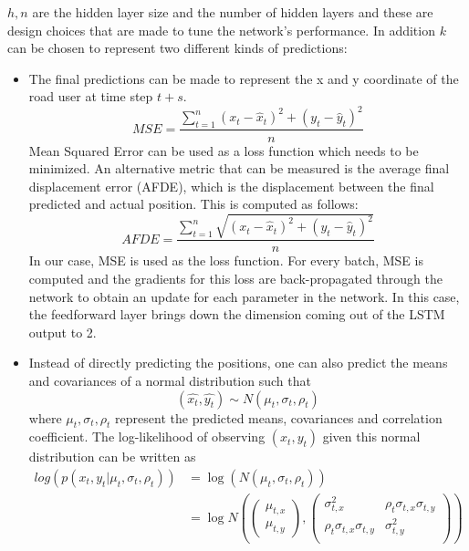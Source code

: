 \documentclass{article}
\begin{document}
 $h,n$ are the hidden layer size and the number of hidden layers and these are design choices that are made to tune the network's performance. In addition $k$ can be chosen to represent two different kinds of predictions:
 \begin{itemize}
     \item The final predictions can be made to represent the  x and y coordinate of the road user at time step $t+s$. 
    \begin{equation}
    MSE=\frac{\sum_{t=1}^n(x_t-\hat{x}_t)^2+(y_t-\hat{y}_t)^2}{n}
    \end{equation}
    Mean Squared Error can be used as a loss function which needs to be minimized. An alternative metric that can be measured is the average final displacement error (AFDE), which is the displacement between the final predicted and actual position. This is computed as follows:
    \begin{equation}
    AFDE=\frac{\sum_{t=1}^n\sqrt{(x_t-\hat{x}_t)^2+(y_t-\hat{y}_t)^2}}{n}
    \end{equation}
    In our case, MSE is used as the loss function. For every batch, MSE is computed and the gradients for this loss are back-propagated through the network to obtain an update for each parameter in the network. In this case, the feedforward layer brings down the dimension coming out of the LSTM output to 2. 
    \item 
Instead of directly predicting the positions, one can also predict the means and covariances of a normal distribution such that 
\begin{equation}
    (\hat{x_t},\hat{y_t})\sim N(\mu_t,\sigma_t,\rho_t)
\end{equation}
where $\mu_t,\sigma_t,\rho_t$ represent the predicted means, covariances and correlation coefficient. The log-likelihood of observing $(x_t,y_t)$ given this normal distribution can be written as 
\begin{equation}\label{eq:lloss}
\begin{split}
    log (p(x_t,y_t |\mu_t,\sigma_t,\rho_t ))&=\log (N(\mu_t,\sigma_t,\rho_t ))\\
    &=\log N(\begin{pmatrix}
    \mu_{t,x}\\
    \mu_{t,y}
    \end{pmatrix},
    \begin{pmatrix}
    \sigma^2_{t,x} & \rho_t\sigma_{t,x}\sigma_{t,y}\\
    \rho_t\sigma_{t,x}\sigma_{t,y} & \sigma^2_{t,y}\\
    \end{pmatrix}
    )
\end{split}
\end{equation}


\end{itemize}
\end{document}

